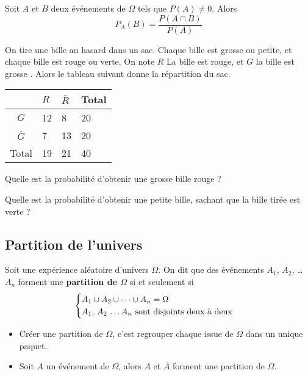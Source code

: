 \documentclass{article}
\begin{document}
\begin{tcolorbox}
\begin{proposition}
Soit $A$ et $B$ deux événements de $\Omega$ tels que $P(A) \neq 0$. Alors 
\begin{equation*}
P_A(B) = \dfrac{P(A \cap B)}{P(A)}
\end{equation*}
\end{proposition}
\end{tcolorbox}
\begin{example}
On tire une bille au hasard dans un sac. Chaque bille est grosse ou petite, et chaque bille est rouge ou verte. On note $R$ \og La bille est rouge\fg, et $G$ \og la bille est grosse \fg. Alors le tableau suivant donne la répartition du sac.
\begin{center}
\begin{tabular}{|c|p{1.5cm}|p{1.5cm}|p{1.5cm}|}
\hline
 &$R$&$\overbar{R}$&Total\\
\hline
$G$&12&8&20\\
\hline
$\overbar{G}$&7&13&20\\
\hline
Total&19&21&40\\
\hline
\end{tabular}
\end{center}
\begin{enumquestions}
\item Quelle est la probabilité d'obtenir une grosse bille rouge ?
\item Quelle est la probabilité d'obtenir une petite bille, sachant que la bille tirée est verte ?
\end{enumquestions}
\vspace*{0.5cm}

\emptybox{3cm}
\end{example}

\newpage
\subsection{Partition de l'univers}
\begin{definition}
Soit une expérience aléatoire d'univers $\Omega$. On dit que des événements $A_1$, $A_2$, \dots $A_n$ forment une \textbf{partition de $\Omega$} si et seulement si
\begin{equation*}
\begin{cases}
A_1 \cup A_2 \cup \dots \cup A_n = \Omega\\
\text{$A_1$, $A_2$ \dots $A_n$ sont disjoints deux à deux} 
\end{cases}
\end{equation*}
\end{definition}
\begin{remark}
\hfill
\begin{itemize}
\item Créer une partition de $\Omega$, c'est regrouper chaque issue de $\Omega$ dans un unique paquet.
\item Soit $A$ un événement de $\Omega$, alors $A$ et $\overbar{A}$ forment une partition de $\Omega$. 
\end{itemize}
\end{remark}
\end{document}

